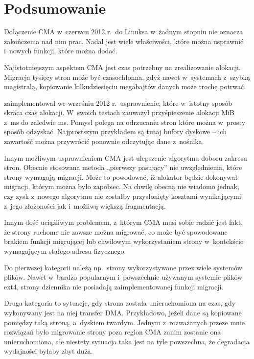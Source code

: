 \section{Podsumowanie}

Dołączenie CMA w~czerwcu 2012 r.\ do Linuksa w~żadnym stopniu nie
oznacza zakończenia nad nim prac.  Nadal jest wiele właściwości, które
można usprawnić i~nowych funkcji, które można dodać.

Najistotniejszym aspektem CMA jest czas potrzebny na zrealizowanie
alokacji.  Migracja tysięcy stron może być czasochłonna, gdyż nawet
w~systemach z~szybką magistralą, kopiowanie kilkudziesięciu megabajtów
danych może trochę potrwać.

\textcite{patch:cma-discard} zaimplementował we wrześniu 2012
r.\ usprawnienie, które w~istotny sposób skraca czas alokacji.
W~swoich testach zauważył przyśpieszenie alokacji \unit[10]{MiB}
z~\unit[146]{ms} do zaledwie \unit[7]{ms}.  Pomysł polega na
odrzucaniu stron które można w~prosty sposób odzyskać.  Najprostszym
przykładem są tutaj bufory dyskowe -- ich zawartość można przywrócić
ponownie odczytując dane z~nośnika.

Innym możliwym usprawnieniem CMA jest ulepszenie algorytmu doboru
zakresu stron.  Obecnie stosowana metoda „pierwszy pasujący” nie
uwzględnienia, które strony wymagają migracji.  Może to powodować, iż
alokator będzie dokonywał migracji, którym można było zapobiec.  Na
chwilę obecną nie wiadomo jednak, czy zysk z~nowego algorytmu nie
zostałby przysłonięty kosztami wynikającymi z~jego złożoności jak
i~możliwą większą fragmentacją.

Innym dość uciążliwym problemem, z~którym CMA musi sobie radzić jest
fakt, że strony ruchome nie zawsze można migrować, co może być
spowodowane brakiem funkcji migrującej lub chwilowym wykorzystaniem
strony w~kontekście wymagającym stałego adresu fizycznego.

Do pierwszej kategorii należą np.\ strony wykorzystywane przez wiele
systemów plików.  Nawet w~bardzo popularnym i~powszechnie używanym
systemie plików ext4, strony dziennika nie posiadają zaimplementowanej
funkcji migracji.

Druga kategoria to sytuacje, gdy strona została unieruchomiona na
czas, gdy wykonywany jest na niej transfer DMA.  Przykładowo, jeżeli
dane są kopiowane pomiędzy taką stroną, a~dyskiem twardym.  Jednym
z~rozważanych przeze mnie rozwiązań było migrowanie strony poza region
CMA zanim zostanie ona unieruchomiona, ale niestety sytuacja taka jest
na tyle powszechna, że degradacja wydajności byłaby zbyt duża.


